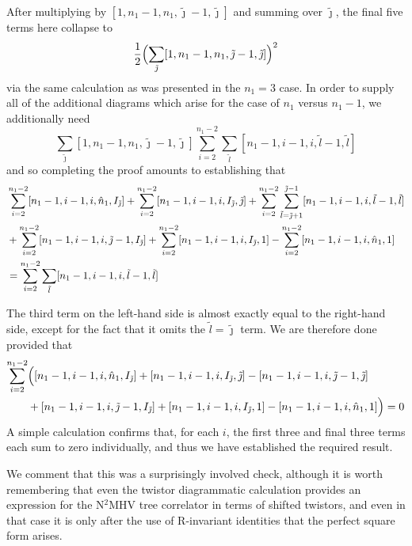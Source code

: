 \documentclass[12pt]{article}
\numberwithin{equation}{section}
\begin{document}
After multiplying by \([1,n_1-1,n_1,\tilde{\jmath}-1,\tilde{\jmath}]\) and summing over \(\tilde{\jmath}\), the final five terms here collapse to
\begin{equation}
\frac{1}{2}\Bigl(\sum_{\tilde{\jmath}}[1,n_1-1,n_1,\tilde{\jmath}-1,\tilde{\jmath}]  \Bigr)^2
\end{equation}
via the same calculation as was presented in the \(n_1=3\) case. In order to supply all of the additional diagrams which arise for the case of \(n_1\) versus \(n_1-1\), we additionally need
\begin{equation}
\sum_{\tilde{\jmath}}[1,n_1-1,n_1,\tilde{\jmath}-1,\tilde{\jmath}] \sum_{i=2}^{n_1-2}\sum_{\tilde{l}}[n_1-1,i-1,i,\tilde{l}-1,\tilde{l}]
\end{equation}
and so completing the proof amounts to establishing that
\begin{align}
&
\sum_{i=2}^{n_1-2}[n_1-1, i-1,i,\hat{n}_1,I_{\tilde{\jmath}}] + \sum_{i=2}^{n_1-2}[n_1-1,i-1,i,I_{\tilde{\jmath}},\tilde{\jmath}] + \sum_{i=2}^{n_1-2}\sum_{\tilde{l}=\tilde{\jmath}+1}^{\tilde{\jmath}-1}[n_1-1,i-1,i,\tilde{l}-1,\tilde{l}] \notag \\
&+ \sum_{i=2}^{n_1-2}[n_1-1,i-1,i,\tilde{\jmath}-1,I_{\tilde{\jmath}}] +\sum_{i=2}^{n_1-2}[n_1-1,i-1,i,I_{\tilde{\jmath}},1] - \sum_{i=2}^{n_1-2}[n_1-1,i-1,i,\hat{n}_1,1] \notag \\
&=  \sum_{i=2}^{n_1-2}\sum_{\tilde{l}}[n_1-1,i-1,i,\tilde{l}-1,\tilde{l}]
\end{align}

The third term on the left-hand side is almost exactly equal to the right-hand side, except for the fact that it omits the \(\tilde{l}=\tilde{\jmath}\) term. We are therefore done provided that
\begin{align}
\sum_{i=2}^{n_1-2}&\Bigl([n_1-1, i-1,i,\hat{n}_1,I_{\tilde{\jmath}}] + [n_1-1,i-1,i,I_{\tilde{\jmath}},\tilde{\jmath}] -[n_1-1,i-1,i,\tilde{\jmath}-1,\tilde{\jmath}] \notag \\
&+ [n_1-1,i-1,i,\tilde{\jmath}-1,I_{\tilde{\jmath}}] +[n_1-1,i-1,i,I_{\tilde{\jmath}},1] - [n_1-1,i-1,i,\hat{n}_1,1]\Bigr) = 0
\end{align}
A simple calculation confirms that, for each \(i\), the first three and final three terms each sum to zero individually, and thus we have established the required result. 

We comment that this was a surprisingly involved check, although it is worth remembering that even the twistor diagrammatic calculation provides an expression for the N\(^2\)MHV tree correlator in terms of shifted twistors, and even in that case it is only after the use of R-invariant identities that the perfect square form arises. 
\end{document}
